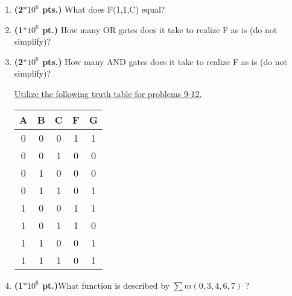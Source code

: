 \documentclass{article}
\begin{document}
\begin{enumerate}
\item {\bf (2$*10^6$ pts.)} What does F(1,1,C) equal?
\pagebreak
\item {\bf (1$*10^6$ pt.)} How many OR gates does it take to realize F
as is (do not simplify)?

\item {\bf (2$*10^6$ pts.)} How many AND gates does it take to realize F 
as is (do not simplify)?

\underline{Utilize the following truth table for problems 9-12.}

\begin{tabular}{c|c|c||c|c}
A & B & C & F & G \\ \hline \hline
0 & 0 & 0 & 1 & 1 \\ \hline
0 & 0 & 1 & 0 & 0 \\ \hline
0 & 1 & 0 & 0 & 0 \\ \hline
0 & 1 & 1 & 0 & 1 \\ \hline
1 & 0 & 0 & 1 & 1 \\ \hline
1 & 0 & 1 & 1 & 0 \\ \hline
1 & 1 & 0 & 0 & 1 \\ \hline
1 & 1 & 1 & 0 & 1 \\
\end{tabular} 


\item {\bf (1$*10^6$ pt.)}What function is described by $\sum m(0,3,4,6,7)$ ?


\end{enumerate}
\end{document}
